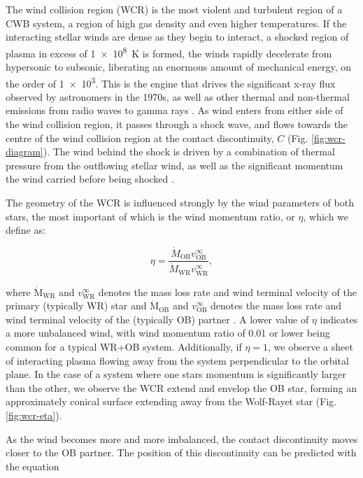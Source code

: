 \noindent
The wind collision region (WCR) is the most violent and turbulent region of a CWB system, a region of high gas density and even higher temperatures.
If the interacting stellar winds are dense as they begin to interact, a shocked region of plasma in excess of \SI{1e8}{\kelvin} is formed, the winds rapidly decelerate from hypersonic to subsonic, liberating an enormous amount of mechanical energy, on the order of \SI{1e3}{\solarluminosity}.
This is the engine that drives the significant x-ray flux observed by astronomers in the 1970s, as well as other thermal and non-thermal emissions from radio waves to gamma rays
\parencite{eichler_particle_1993,grimaldoProtonAccelerationColliding2019}.
As wind enters from either side of the wind collision region, it passes through a shock wave, and flows towards the centre of the wind collision region at the contact discontinuity, $C$ (Fig. \ref{fig:wcr-diagram}).
The wind behind the shock is driven by a combination of thermal pressure from the outflowing stellar wind, as well as the significant momentum the wind carried before being shocked \parencite{stevens_colliding_1992}.

The geometry of the WCR is influenced strongly by the wind parameters of both stars, the most important of which is the wind momentum ratio, or $\eta$, which we define as:

\begin{equation}
  \eta = \frac{\dot M_\text{OB} v^\infty_\text{OB}}{\dot M_\text{WR} v^\infty_\text{WR}},
\end{equation}

\noindent
where $\dot{\text{M}}_\text{WR}$ and $v^{\infty}_\text{WR}$ denotes the mass loss rate and wind terminal velocity of the primary (typically WR) star and $\dot{\text{M}}_\text{OB}$ and $v^{\infty}_\text{OB}$ denotes the mass loss rate and wind terminal velocity of the (typically OB) partner \parencite{usov_stellar_1991}.
A lower value of $\eta$ indicates a more unbalanced wind, with wind momentum ratio of \num{0.01} or lower being common for a typical WR+OB system.
Additionally, if $\eta = 1$, we observe a sheet of interacting plasma flowing away from the system perpendicular to the orbital plane.
In the case of a system where one stars momentum is significantly larger than the other, we observe the WCR extend and envelop the OB star, forming an approximately conical surface extending away from the Wolf-Rayet star (Fig. \ref{fig:wcr-eta}).


As the wind becomes more and more imbalanced, the contact discontinuity moves closer to the OB partner.
The position of this discontinuity can be predicted with the equation

